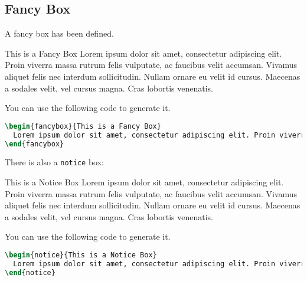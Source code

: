 \documentclass[twoside]{seu-ml-assign}
\renewcommand{\sectionheadname}{Section}
\begin{document}
    \subsection{Fancy Box} A fancy box has been defined.
      \begin{fancybox}{This is a Fancy Box}
        Lorem ipsum dolor sit amet, consectetur adipiscing elit. Proin viverra massa rutrum felis vulputate, ac faucibus velit accumsan. Vivamus aliquet felis nec interdum sollicitudin. Nullam ornare eu velit id cursus. Maecenas a sodales velit, vel cursus magna. Cras lobortis venenatis.
      \end{fancybox}

    You can use the following code to generate it.
    \begin{lstlisting}[language=tex,numbers=none,morekeywords={begin}]
\begin{fancybox}{This is a Fancy Box}
  Lorem ipsum dolor sit amet, consectetur adipiscing elit. Proin viverra massa rutrum felis vulputate, ac faucibus velit accumsan. Vivamus aliquet felis nec interdum sollicitudin. Nullam ornare eu velit id cursus. Maecenas a sodales velit, vel cursus magna. Cras lobortis venenatis.
\end{fancybox}
    \end{lstlisting}

    There is also a \texttt{notice} box:
    \begin{notice}{This is a Notice Box}
      Lorem ipsum dolor sit amet, consectetur adipiscing elit. Proin viverra massa rutrum felis vulputate, ac faucibus velit accumsan. Vivamus aliquet felis nec interdum sollicitudin. Nullam ornare eu velit id cursus. Maecenas a sodales velit, vel cursus magna. Cras lobortis venenatis.
    \end{notice}

    You can use the following code to generate it.
    \begin{lstlisting}[language=tex,numbers=none,morekeywords={begin}]
\begin{notice}{This is a Notice Box}
  Lorem ipsum dolor sit amet, consectetur adipiscing elit. Proin viverra massa rutrum felis vulputate, ac faucibus velit accumsan. Vivamus aliquet felis nec interdum sollicitudin. Nullam ornare eu velit id cursus. Maecenas a sodales velit, vel cursus magna. Cras lobortis venenatis.
\end{notice}
    \end{lstlisting}

  \appendix
  \renewcommand{\sectionheadname}{Appendix}
\end{document}
